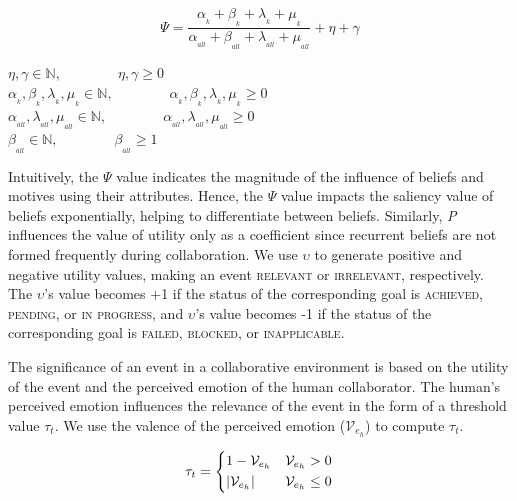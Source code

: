 \documentclass{article}
\begin{document}
\vspace*{-3mm}
\begin{equation}
    \Psi = \frac{\alpha_{_k} + \beta_{_k} + \lambda_{_k} +
    \mu_{_k}}{\alpha_{_{all}} + \beta_{_{all}} + \lambda_{_{all}} +
    \mu_{_{all}}} + \eta + \gamma
    \label{eqn:power}
\end{equation}

\vspace*{-1mm}
\begin{center} 
    $\eta, \gamma \in \mathbb{N}, \qquad\qquad \eta, \gamma \geq 0$\\
    $\alpha_{_k}, \beta_{_k}, \lambda_{_k}, \mu_{_k} \in \mathbb{N},
    \qquad\qquad \alpha_{_k}, \beta_{_k}, \lambda_{_k}, \mu_{_k} \geq 0$\\
    $\alpha_{_{all}}, \lambda_{_{all}}, \mu_{_{all}} \in \mathbb{N},
    \qquad\qquad \alpha_{_{all}}, \lambda_{_{all}}, \mu_{_{all}} \geq 0$\\
    $\beta_{_{all}} \in \mathbb{N}, \qquad\qquad \beta_{_{all}} \geq 1$
\end{center}

Intuitively, the $\Psi$ value indicates the magnitude of the influence of
beliefs and motives using their attributes. Hence, the $\Psi$ value impacts the
saliency value of beliefs exponentially, helping to differentiate between
beliefs. Similarly, \textit{P} influences the value of utility only as a
coefficient since recurrent beliefs are not formed frequently during
collaboration. We use $\upsilon$ to generate positive and negative utility
values, making an event \textsc{relevant} or \textsc{irrelevant}, respectively.
The $\upsilon$'s value becomes +1 if the status of the corresponding goal is
\textsc{achieved}, \textsc{pending}, or \textsc{in progress}, and $\upsilon$'s
value becomes -1 if the status of the corresponding goal is \textsc{failed,
blocked}, or \textsc{inapplicable}.

The significance of an event in a collaborative environment is based on the
utility of the event and the perceived emotion of the human collaborator. The
human's perceived emotion influences the relevance of the event in the form of a
threshold value $\tau_{t}$. We use the valence of the perceived emotion
($\mathcal{V}_{e_h}$) to compute $\tau_{t}$.

\vspace*{-5mm}
\begin{equation}
    \tau_{t}= 
    \begin{dcases}
       1-\mathcal{V}_{e_h} & \mathcal{V}_{e_h} > 0 \\
       |\mathcal{V}_{e_h}| & \mathcal{V}_{e_h} \leq  0
    \end{dcases}
    \label{eqn:utility}
\end{equation}
\end{document}
